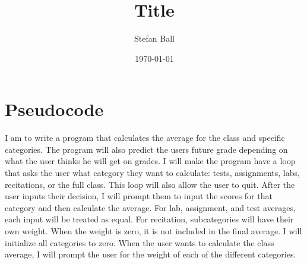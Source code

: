 \documentclass{article}
\title{Title}
\author{Stefan Ball}
\date{\today}
\begin{document}
\maketitle

\section*{Pseudocode}

I am to write a program that calculates the average for the class and specific categories. The program will also predict the users future grade depending on what the user thinks he will get on grades. I will make the program have a loop that asks the user what category they want to calculate: tests, assignments, labs, recitations, or the full class. This loop will also allow the user to quit. After the user inputs their decision, I will prompt them to input the scores for that category and then calculate the average. For lab, assignment, and test averages, each input will be treated as equal. For recitation, subcategories will have their own weight. When the weight is zero, it is not included in the final average. I will initialize all categories to zero. When the user wants to calculate the class average, I will prompt the user for the weight of each of the different categories.














\end{document}

